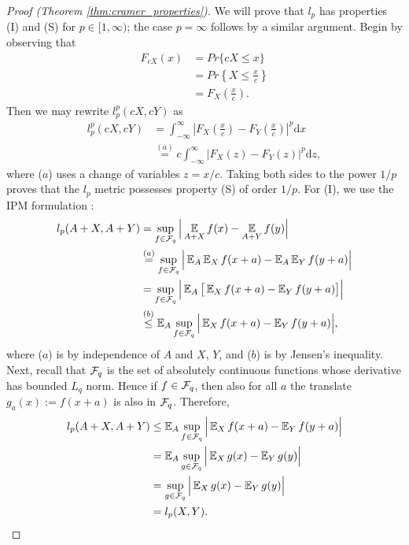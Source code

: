 \documentclass{article}
\def \ldive {l}
\def \dx {\textrm{d} x}
\begin{document}
\begin{proof}[Proof (Theorem \ref{thm:cramer_properties})]
We will prove that $\ldive_p$ has properties (I) and (S) for $p \in [1, \infty)$; the case $p = \infty$ follows by a similar argument. Begin by observing that
\begin{align*}
F_{cX}(x) &= Pr\{ cX \le x \} \\
&= Pr\left\{X \le \frac{x}{c}\right\} \\
&= F_X\left(\frac{x}{c}\right).
\end{align*}
Then we may rewrite $\ldive_p^p(cX, cY)$ as
\begin{align*}
\ldive_p^p(cX, cY) &= \int_{-\infty}^{\infty} \left | F_X\left(\frac{x}{c} \right) - F_Y \left(\frac{x}{c} \right) \right |^p \dx \\
&\overset{(a)}{=}  c \int_{-\infty}^{\infty} \Big | F_X\left(z \right) - F_Y \left(z \right) \Big |^p \textrm{d} z,
%
%
\end{align*}
where ($a$) uses a change of variables $z = x/c$. Taking both sides to the power $1/p$ proves that the $\ldive_p$ metric possesses property (S) of order $1/p$. For (I), we use the IPM formulation :
\begin{align*}
\ldive_p(A + X, A + Y) &= \sup_{f \in \cF_q} \Big | \expect_{A + X} f(x) - \expect_{A + Y} f(y) \Big | \\
&\overset{(a)}{=} \sup_{f \in \cF_q} \Big | \expects_A \expects_{X} f(x + a) - \expects_A \expects_{Y} f(y + a) \Big | \\
&= \sup_{f \in \cF_q} \Big | \expects_A \big [ \expects_{X} f(x + a) - \expects_{Y} f(y + a) \big] \Big | \\
&\overset{(b)}{\le} \expects_A \sup_{f \in \cF_q} \Big | \expects_{X} f(x + a) - \expects_{Y} f(y + a) \Big |,
\end{align*}
where ($a$) is by independence of $A$ and $X$, $Y$, and ($b$) is by Jensen's inequality. Next, recall that $\mathcal{F}_q$ is the set of absolutely continuous functions whose derivative has bounded $L_q$ norm. Hence if $f \in \mathcal{F}_q$, then also for all $a$ the translate $g_a(x) := f(x + a)$ is also in $\mathcal{F}_q$. Therefore,
\begin{align*}
\ldive_p(A + X, A + Y) &\le \expects_A \sup_{f \in \cF_q} \Big | \expects_{X} f(x + a) - \expects_{Y} f(y + a) \Big | \\
&= \expects_A \sup_{g \in \cF_q} \Big | \expects_{X} g(x) - \expects_{Y} g(y) \Big  | \\
&= \sup_{g \in \cF_q} \Big | \expects_{X} g(x) - \expects_{Y} g(y) \Big | \\
&= \ldive_p(X, Y). \qedhere
\end{align*}


\end{proof}
\end{document}

